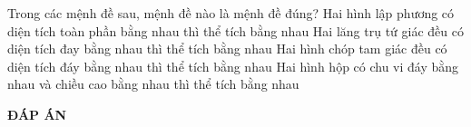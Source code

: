 \begin{ex}%
Trong các mệnh đề sau, mệnh đề nào là mệnh đề đúng?
\choice
{\True Hai hình lập phương có diện tích toàn phần bằng nhau thì thể tích bằng nhau}
{Hai lăng trụ tứ giác đều có diện tích đay bằng nhau thì thể tích bằng nhau}
{Hai hình chóp tam giác đều có diện tích đáy bằng nhau thì thể tích bằng nhau}
{Hai hình hộp có chu vi đáy bằng nhau và chiều cao bằng nhau thì thể tích bằng nhau}
\end{ex}

\newpage
\begin{center}
	\textbf{ĐÁP ÁN}
\end{center}
\begin{multicols}{10}
	 
\end{multicols}

